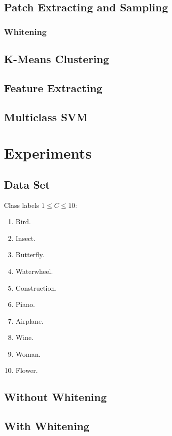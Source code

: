 \documentclass{acm_proc_article-sp}
\begin{document}
\subsection{Patch Extracting and Sampling}
\subsubsection{Whitening}

\subsection{K-Means Clustering}

\subsection{Feature Extracting}

\subsection{Multiclass SVM}

\section{Experiments}

\subsection{Data Set}
Class labels $1\leq C \leq 10$:
\begin{enumerate}[1.]
\item Bird.
\item Insect.
\item Butterfly.
\item Waterwheel.
\item Construction.
\item Piano.
\item Airplane.
\item Wine.
\item Woman.
\item Flower.
\end{enumerate}

\subsection{Without Whitening}

\subsection{With Whitening}
\end{document}

